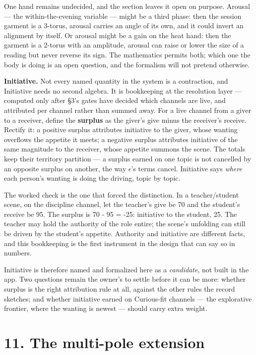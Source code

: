 One hand remains undecided, and the section leaves it open on purpose.
Arousal --- the within-the-evening variable --- might be a third phase:
then the session garment is a 3-torus, arousal carries an angle of its
own, and it could invert an alignment by itself. Or arousal might be a
gain on the heat hand: then the garment is a 2-torus with an amplitude,
arousal can raise or lower the size of a reading but never reverse its
sign. The mathematics permits both; which one the body is doing is an
open question, and the formalism will not pretend otherwise.

\textbf{Initiative.} Not every named quantity in the system is a
contraction, and Initiative needs no second algebra. It is bookkeeping
at the resolution layer --- computed only after \S 3's gates have decided
which channels are live, and attributed per channel rather than summed
away. For a live channel from a giver to a receiver, define the
\textbf{surplus} as the giver's give minus the receiver's receive.
Rectify it: a positive surplus attributes initiative to the giver, whose
wanting overflows the appetite it meets; a negative surplus attributes
initiative of the same magnitude to the receiver, whose appetite summons
the scene. The totals keep their territory partition --- a surplus
earned on one topic is not cancelled by an opposite surplus on another,
the way $\epsilon$'s terms cancel. Initiative says \emph{where} each person's
wanting is doing the driving, topic by topic.

The worked check is the one that forced the distinction. In a
teacher/student scene, on the discipline channel, let the teacher's give
be 70 and the student's receive be 95. The surplus is 70 - 95 = -25:
initiative to the student, 25. The teacher may hold the authority of the
role entire; the scene's unfolding can still be driven by the student's
appetite. Authority and initiative are different facts, and this
bookkeeping is the first instrument in the design that can say so in
numbers.

Initiative is therefore named and formalized here as a \emph{candidate},
not built in the app. Two questions remain the owner's to settle before
it can be more: whether surplus is the right attribution rule at all,
against the other rules the record sketches; and whether initiative
earned on Curious-fit channels --- the explorative frontier, where the
wanting is newest --- should carry extra weight.

\section{11. The multi-pole extension}\label{the-multi-pole-extension}

